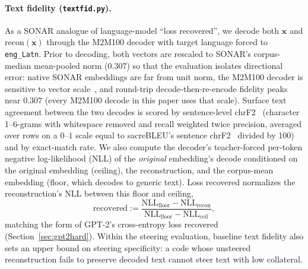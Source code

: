 \paragraph{Text fidelity (\texttt{textfid.py}).}
As a SONAR analogue of language-model ``loss recovered'', we decode both
$\mathbf{x}$ and $\mathrm{recon}(\mathbf{x})$ through the M2M100 decoder
with target language forced to \texttt{eng\_Latn}. Prior to decoding, both
vectors are rescaled to SONAR's corpus-median mean-pooled norm ($0.307$) so
that the evaluation isolates directional error: native SONAR embeddings are
far from unit norm, the M2M100 decoder is sensitive to vector
scale~\cite{qiu2026unifiedvisionlanguagemodelingconcept}, and round-trip
decode-then-re-encode fidelity peaks near $0.307$ (every M2M100 decode in
this paper uses that scale). Surface text agreement between the two decodes
is scored by sentence-level chrF2~\cite{popovic-2015-chrf,popovic2016}
(character 1--6-grams with whitespace removed and recall weighted twice
precision, averaged over rows on a $0$--$1$ scale equal to sacreBLEU's
sentence chrF2~\cite{post2018} divided by 100) and by exact-match rate. We
also compute the decoder's teacher-forced per-token negative log-likelihood
(NLL) of the \emph{original} embedding's decode conditioned on the original
embedding (ceiling), the reconstruction, and the corpus-mean embedding
(floor, which decodes to generic text). Loss recovered normalizes the
reconstruction's NLL between this floor and ceiling,
\begin{equation}
	\mathrm{recovered} := \frac{\mathrm{NLL}_{\mathrm{floor}} - \mathrm{NLL}_{\mathrm{recon}}}
	                           {\mathrm{NLL}_{\mathrm{floor}} - \mathrm{NLL}_{\mathrm{ceil}}},
	\label{eq:lossrec}
\end{equation}
matching the form of GPT-2's cross-entropy loss recovered
(Section~\ref{sec:gpt2hard}). Within the steering evaluation, baseline text
fidelity also sets an upper bound on steering specificity: a code whose
unsteered reconstruction fails to preserve decoded text cannot steer text
with low collateral.

